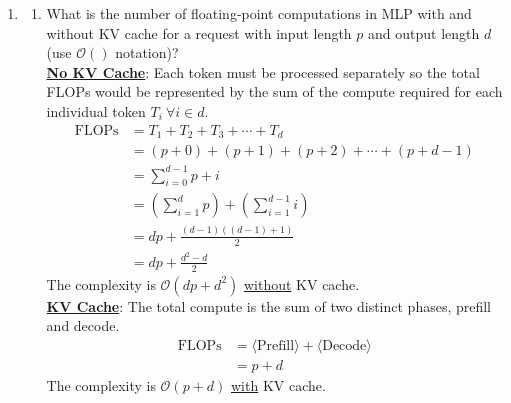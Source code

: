 \documentclass[12pt]{article}
\begin{document}
\begin{enumerate}[label=\textbf{Q\arabic*.}]
\begin{enumerate}
        If RoPE were applied after, then the cached keys will be the same, but in a different order. The K cache would now resemble the V cache as described in the previous question. The segments associated with [Text] and [Question] would be the same in K and V caches but swapped depending on the order these segments were received in the request.

    \end{enumerate}

    \item 
    \begin{enumerate}
        \item What is the number of floating-point computations in MLP with and without KV cache for a request with input length $p$ and output length $d$ (use $\mathcal{O}()$ notation)?\\
        
        \textbf{\underline{No KV Cache}}: Each token must be processed separately so the total FLOPs would be represented by the sum of the compute required for each individual token $T_i\ \forall i \in d$.
        \begin{align*}
            \text{FLOPs} &= T_1 + T_2 + T_3 + \cdots + T_d \\
            &= \left(p+0\right) + \left(p+1\right) + \left(p+2\right) + \cdots + \left(p+d-1\right) \\
            &= \sum_{i=0}^{d-1} p+i \\
            &= \left(\sum_{i=1}^{d} p\right) + \left( \sum_{i=1}^{d-1} i\right) \\
            &= dp + \frac{\left(d-1\right)\left(\left(d-1\right)+1\right)}{2} \\
            &= dp + \frac{d^2-d}{2}
        \end{align*}
        The complexity is $\boxed{\mathcal{O}\left(dp + d^2\right)}$ \underline{without} KV cache.\\ 

        \textbf{\underline{KV Cache}}: The total compute is the sum of two distinct phases, prefill and decode.
        \begin{align*}
            \text{FLOPs} &= \langle\text{Prefill}\rangle + \langle\text{Decode}\rangle \\
            &= p + d
        \end{align*}
        The complexity is $\boxed{\mathcal{O}\left(p+d\right)}$ \underline{with} KV cache.\\
        

\end{enumerate}
\end{enumerate}
\end{document}
